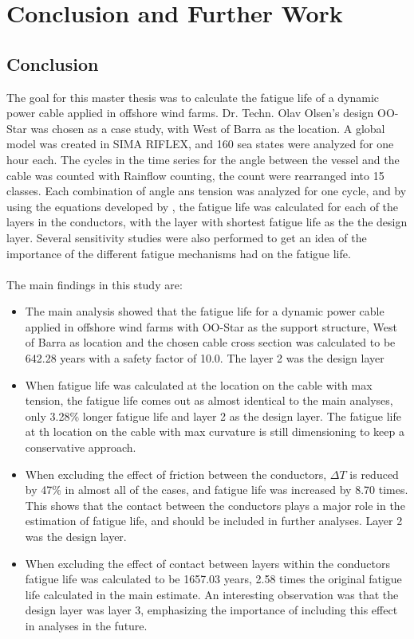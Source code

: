 \chapter{Conclusion and Further Work}
\label{chap:conclusion}
\section{Conclusion}
The goal for this master thesis was to calculate the fatigue life of a dynamic power cable applied in offshore wind farms. Dr. Techn. Olav Olsen's design OO-Star was chosen as a case study, with West of Barra as the location. A global model was created in SIMA RIFLEX, and 160 sea states were analyzed for one hour each. The cycles in the time series for the angle between the vessel and the cable was counted with Rainflow counting, the count were rearranged into 15 classes. Each combination of angle ans tension was analyzed for one cycle, and by using the equations developed by \cite{s300}, the fatigue life was calculated for each of the layers in the conductors, with the layer with shortest fatigue life as the the design layer. Several sensitivity studies were also performed to get an idea of the importance of the different fatigue mechanisms had on the fatigue life.\\\\The main findings in this study are:
\begin{itemize}
    \item The main analysis showed that the fatigue life for a dynamic power cable applied in offshore wind farms with OO-Star as the support structure, West of Barra as location and the chosen cable cross section was calculated to be 642.28 years with a safety factor of 10.0. The layer 2 was the design layer
    \item When fatigue life was calculated at the location on the cable with max tension, the fatigue life comes out as almost identical to the main analyses, only 3.28\% longer fatigue life and layer 2 as the design layer. The fatigue life at th location on the cable with max curvature is still dimensioning to keep a conservative approach.
    \item When excluding the effect of friction between the conductors, $\Delta T$ is reduced by 47\% in almost all of the cases, and fatigue life was increased by 8.70 times. This shows that the contact between the conductors plays a major role in the estimation of fatigue life, and should be included in further analyses. Layer 2 was the design layer. 
    \item When excluding the effect of contact between layers within the conductors fatigue life was calculated to be 1657.03 years, 2.58 times the original fatigue life calculated in the main estimate. An interesting observation was that the design layer was layer 3, emphasizing the importance of including this effect in analyses in the future. 
\end{itemize}

